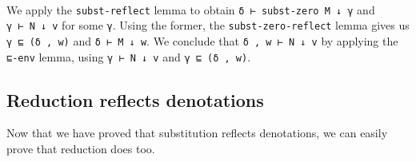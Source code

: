 \begin{fence}
\begin{code}
\AgdaOperator{\AgdaInductiveConstructor{,}}\AgdaSpace{}%
\AgdaSpace{}%
\AgdaSpace{}%
\AgdaOperator{\AgdaInductiveConstructor{,}}\AgdaSpace{}%
\AgdaSpace{}%
\AgdaSpace{}%
\AgdaSpace{}%
\AgdaSpace{}%
\AgdaSpace{}%
\<%
\\
\>[0]%
\>[7]\AgdaSymbol{|}\AgdaSpace{}%
\AgdaSpace{}%
\AgdaSpace{}%
\AgdaOperator{\AgdaInductiveConstructor{,}}\AgdaSpace{}%
\AgdaSpace{}%
\AgdaSpace{}%
\AgdaOperator{\AgdaInductiveConstructor{,}}\AgdaSpace{}%
\AgdaSpace{}%
\AgdaSpace{}%
\AgdaSpace{}%
\AgdaSymbol{=}\AgdaSpace{}%
\AgdaSpace{}%
\AgdaSpace{}%
\AgdaOperator{\AgdaInductiveConstructor{,}}\AgdaSpace{}%
\AgdaSpace{}%
\AgdaSpace{}%
\AgdaOperator{\AgdaInductiveConstructor{,}}\AgdaSpace{}%
\AgdaSpace{}%
\AgdaSpace{}%
\AgdaSpace{}%
\AgdaSpace{}%
\<%
\end{code}
\end{fence}

We apply the \texttt{subst-reflect} lemma to obtain
\texttt{δ\ ⊢\ subst-zero\ M\ ↓\ γ} and \texttt{γ\ ⊢\ N\ ↓\ v} for some
\texttt{γ}. Using the former, the \texttt{subst-zero-reflect} lemma
gives us \texttt{γ\ ⊑\ (δ\ ,\ w)} and \texttt{δ\ ⊢\ M\ ↓\ w}. We
conclude that \texttt{δ\ ,\ w\ ⊢\ N\ ↓\ v} by applying the
\texttt{⊑-env} lemma, using \texttt{γ\ ⊢\ N\ ↓\ v} and
\texttt{γ\ ⊑\ (δ\ ,\ w)}.

\hypertarget{reduction-reflects-denotations-1}{%
\subsection{Reduction reflects
denotations}\label{reduction-reflects-denotations-1}}

Now that we have proved that substitution reflects denotations, we can
easily prove that reduction does too.

